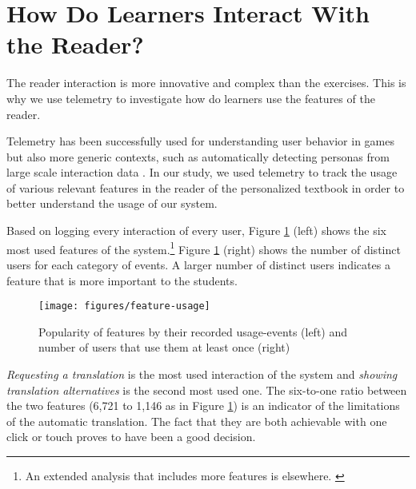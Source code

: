 





\section{How Do Learners Interact With the Reader?}
\newcommand{\feature}[1]{{\em #1}}
The reader interaction is more innovative and complex than the exercises.
This is why we use telemetry to investigate how do learners use the features of the reader. 

Telemetry has been successfully used for understanding user behavior in games \cite{Gagne11-telemetry} but also more generic contexts, such as automatically detecting personas from large scale interaction data \cite{Zhang16-telemetry}. In our study, we used telemetry to track the usage of various relevant features in the reader of the personalized textbook in order to better understand the usage of our system.

Based on logging every interaction of every user, Figure \ref{fig:feature_usage} (left) shows the six most used features of the system.\footnote{An extended analysis that includes more features is elsewhere. \cite{Chirtoaca17-apollo}} Figure \ref{fig:feature_usage} (right) shows the number of distinct users for each category of events. A larger number of distinct users indicates a feature that is more important to the students. 

  \begin{figure}[h!]
  \centering
    \texttt{[image: figures/feature-usage]}
    \caption{Popularity of features by their recorded usage-events (left) and number of users that use them at least once (right)}
    \label{fig:feature_usage}
  \end{figure}

\feature{Requesting a translation} is the most used interaction of the system and \feature{showing translation alternatives} is the second most used one. The six-to-one ratio between the two features (6,721 to 1,146 as in Figure \ref{fig:feature_usage}) is an indicator of the limitations of the automatic translation. The fact that they are both achievable with one click or touch proves to have been a good decision. 

